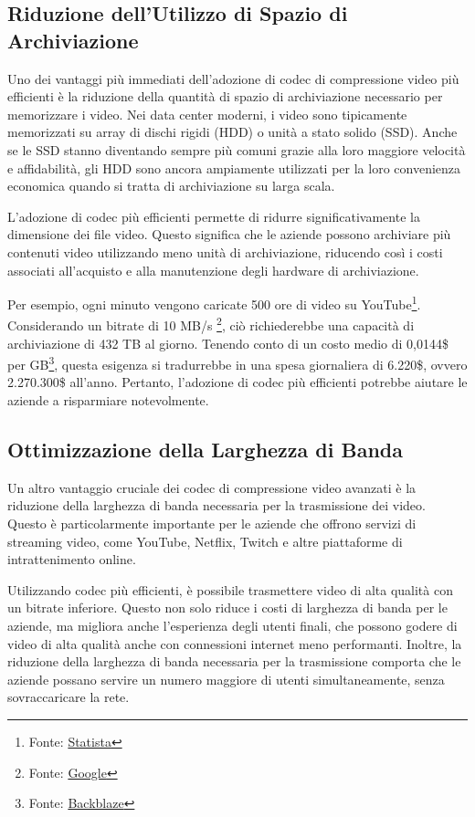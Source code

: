 \documentclass[a4paper,12pt, oneside]{article}
\begin{document}
\subsection{Riduzione dell'Utilizzo di Spazio di Archiviazione}
Uno dei vantaggi più immediati dell'adozione di codec di compressione video più efficienti è la riduzione
della quantità di spazio di archiviazione necessario per memorizzare i video. Nei data center moderni, i
video sono tipicamente memorizzati su array di dischi rigidi (HDD) o unità a stato solido (SSD). Anche se
le SSD stanno diventando sempre più comuni grazie alla loro maggiore velocità e affidabilità, gli HDD
sono ancora ampiamente utilizzati per la loro convenienza economica quando si tratta di archiviazione
su larga scala.

L'adozione di codec più efficienti permette di ridurre significativamente la dimensione dei file video.
Questo significa che le aziende possono archiviare più contenuti video utilizzando meno unità di archiviazione,
riducendo così i costi associati all'acquisto e alla manutenzione degli hardware di archiviazione.

Per esempio, ogni minuto vengono caricate 500 ore di video su YouTube\footnote{Fonte: \href{https://www.statista.com/statistics/259477/hours-of-video-uploaded-to-youtube-every-minute/}{Statista}}.
Considerando un bitrate di 10 MB/s \footnote{Fonte: \href{https://support.google.com/youtube/answer/2853702?hl=it}{Google}},
ciò richiederebbe una capacità di archiviazione di 432 TB al giorno. Tenendo conto di un costo medio di
0,0144\$ per GB\footnote{Fonte: \href{https://www.backblaze.com/blog/hard-drive-cost-per-gigabyte/}{Backblaze}},
questa esigenza si tradurrebbe in una spesa giornaliera di 6.220\$, ovvero 2.270.300\$ all'anno. Pertanto,
l'adozione di codec più efficienti potrebbe aiutare le aziende a risparmiare notevolmente.

\subsection{Ottimizzazione della Larghezza di Banda}
Un altro vantaggio cruciale dei codec di compressione video avanzati è la riduzione della larghezza di
banda necessaria per la trasmissione dei video. Questo è particolarmente importante per le aziende che
offrono servizi di streaming video, come YouTube, Netflix, Twitch e altre piattaforme di intrattenimento online.

Utilizzando codec più efficienti, è possibile trasmettere video di alta qualità con un bitrate inferiore.
Questo non solo riduce i costi di larghezza di banda per le aziende, ma migliora anche l'esperienza degli
utenti finali, che possono godere di video di alta qualità anche con connessioni internet meno performanti.
Inoltre, la riduzione della larghezza di banda necessaria per la trasmissione comporta che le aziende possano
servire un numero maggiore di utenti simultaneamente, senza sovraccaricare la rete.
\end{document}
